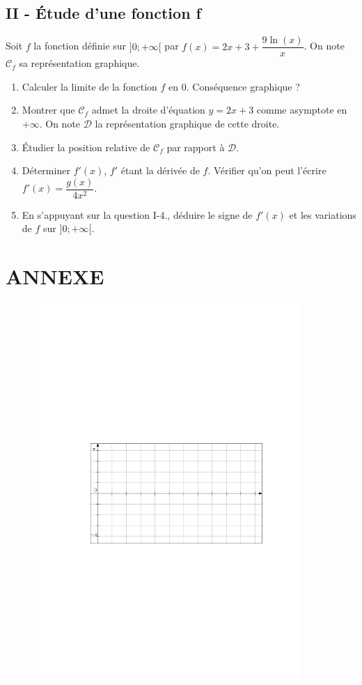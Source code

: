 \documentclass[12pt]{article}
\begin{document}
      \subsection*{II - Étude d'une fonction f}
      Soit $f$ la fonction définie sur $] 0 ; + \infty [$ par $f(x) = 2x + 3 + \dfrac{9 \ln(x)}{x}$.
      On note $\mathcal{C}_f$ sa représentation graphique.

      \begin{enumerate}
      \item[1.] Calculer la limite de la fonction $f$ en $0$. Conséquence graphique ?
      \item[2.] Montrer que $\mathcal{C}_f$ admet la droite d'équation $y = 2x + 3$ comme asymptote en $+\infty$. On note $\mathcal{D}$ la représentation graphique de cette droite.
      \item[3.] Étudier la position relative de $\mathcal{C}_f$ par rapport à $\mathcal{D}$.
      \item[4.] Déterminer $f'(x)$, $f'$ étant la dérivée de $f$. Vérifier qu'on peut l'écrire $f'(x) = \dfrac{g(x)}{4x^2}$.
      \item[5.] En s'appuyant sur la question I-4., déduire le signe de $f'(x)$ et les variations de $f$ sur  $] 0 ; + \infty [$. 
      \end{enumerate}

      \noindent\hrulefill

      \section*{ANNEXE}

      \begin{figure}[h]
        \centering
        \includegraphics[width=0.9\textwidth]{sources/ie/grille.pdf}
      \end{figure}
\end{document}
